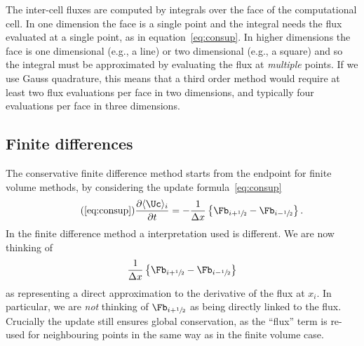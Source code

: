 The inter-cell fluxes are computed by integrals over the face of the
computational cell. In one dimension the face is a single point and the
integral needs the flux evaluated at a single point, as in
equation~\ref{eq:consup}. In higher dimensions the face is one dimensional
(e.g., a line) or two dimensional (e.g., a square) and so the integral must be
approximated by evaluating the flux at \emph{multiple} points. If we use Gauss
quadrature, this means that a third order method would require at least two
flux evaluations per face in two dimensions, and typically four evaluations per
face in three dimensions.

%
%

\subsection{Finite differences}

The conservative finite difference method starts from the endpoint for finite
volume methods, by considering the update formula~\eqref{eq:consup}
\begin{equation}
\tag{\ref{eq:consup}}
\frac{\partial \langle \Uc\rangle_{i}}{\partial t} =
  - \frac{1}{\Delta x} \left \{ \Fb_{i+\myhalf} -
                                \Fb_{i-\myhalf} \right \}.
\end{equation}
In the finite difference method a interpretation used is different. We are now
thinking of
\begin{equation}
  \label{eq:fd-deriv}
  \frac{1}{\Delta x} \left \{ \Fb_{i+\myhalf} -
                                \Fb_{i-\myhalf} \right \}
\end{equation}
as representing a direct approximation to the derivative of the flux at $x_i$.
In particular, we are \emph{not} thinking of $\Fb_{i+\myhalf}$ as being
directly linked to the flux. Crucially the update still ensures global
conservation, as the ``flux'' term is re-used for neighbouring points in the
same way as in the finite volume case.

